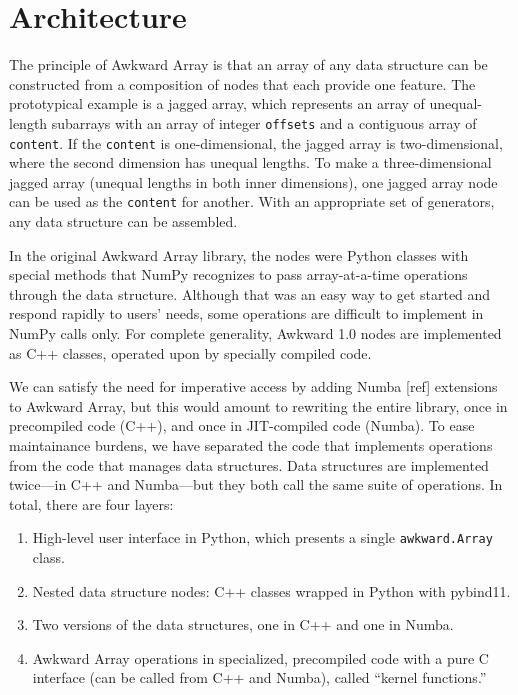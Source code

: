 \documentclass{webofc}
\begin{document}
\section{Architecture}

The principle of Awkward Array is that an array of any data structure can be constructed from a composition of nodes that each provide one feature. The prototypical example is a jagged array, which represents an array of unequal-length subarrays with an array of integer \texttt{offsets} and a contiguous array of \texttt{content}. If the \texttt{content} is one-dimensional, the jagged array is two-dimensional, where the second dimension has unequal lengths. To make a three-dimensional jagged array (unequal lengths in both inner dimensions), one jagged array node can be used as the \texttt{content} for another. With an appropriate set of generators, any data structure can be assembled.

In the original Awkward Array library, the nodes were Python classes with special methods that NumPy recognizes to pass array-at-a-time operations through the data structure. Although that was an easy way to get started and respond rapidly to users' needs, some operations are difficult to implement in NumPy calls only. For complete generality, Awkward 1.0 nodes are implemented as C++ classes, operated upon by specially compiled code.

We can satisfy the need for imperative access by adding Numba [ref] extensions to Awkward Array, but this would amount to rewriting the entire library, once in precompiled code (C++), and once in JIT-compiled code (Numba). To ease maintainance burdens, we have separated the code that implements operations from the code that manages data structures. Data structures are implemented twice---in C++ and Numba---but they both call the same suite of operations. In total, there are four layers:

\begin{enumerate}
\item High-level user interface in Python, which presents a single \texttt{awkward.Array} class.
\item Nested data structure nodes: C++ classes wrapped in Python with pybind11.
\item Two versions of the data structures, one in C++ and one in Numba.
\item Awkward Array operations in specialized, precompiled code with a pure C interface (can be called from C++ and Numba), called ``kernel functions.''
\end{enumerate}
\end{document}
